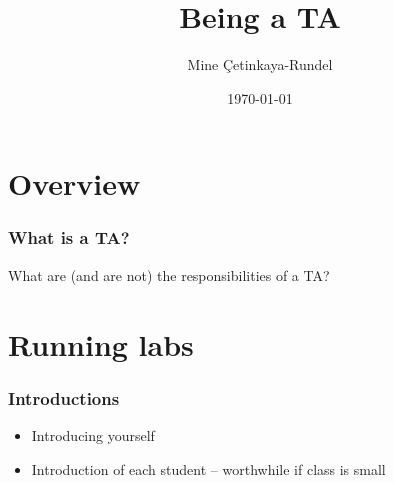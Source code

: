 \documentclass{beamer}
\title{Being a TA}
\date{\today}
\author{Mine \c{C}etinkaya-Rundel}
\institute{Sta 771S - Teaching Statistics}
\begin{document}
\maketitle
 
 

\section{Overview}


\begin{frame}
\frametitle{What is a TA?}

What are (and are not) the responsibilities of a TA?

\vfill

\end{frame}


\section{Running labs}


\begin{frame}
\frametitle{Introductions}

\begin{itemize}

\item Introducing yourself

\item Introduction of each student -- worthwhile if class is small

\end{itemize}

\end{frame}

\end{document}
